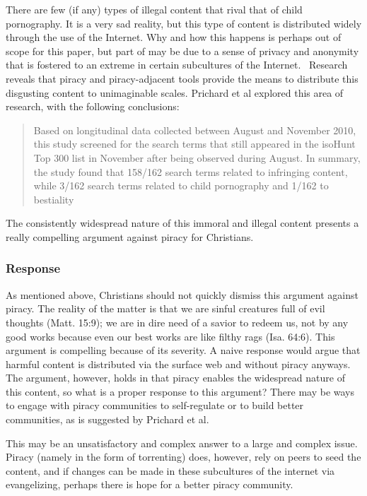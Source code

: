 \documentclass[onecolumn, 12pt]{article}
\begin{document}
There are few (if any) types of illegal content that rival that of child
pornography. It is a very sad reality, but this type of content is distributed
widely through the use of the Internet. Why and how this happens is perhaps out
of scope for this paper, but part of may be due to a sense of privacy and
anonymity that is fostered to an extreme in certain subcultures of the
Internet.~\cite[588]{prichard:subcultures} Research reveals that piracy and
piracy-adjacent tools provide the means to distribute this disgusting content
to unimaginable scales. Prichard et al explored this area of research, with
the following conclusions:
\blockcquote[593]{prichard:subcultures}{%
  Based on longitudinal data collected between August and November 2010, this
  study screened for the search terms that still appeared in the isoHunt Top
  300 list in November after being observed during August. In summary, the
  study found that 158/162 search terms related to infringing content, while
  3/162 search terms related to child pornography and 1/162 to bestiality%
}
The consistently widespread nature of this immoral and illegal content presents
a really compelling argument against piracy for Christians.

\subsubsection{Response}
As mentioned above, Christians should not quickly dismiss this argument against
piracy. The reality of the matter is that we are sinful creatures full of
evil thoughts (Matt. 15:9); we are in dire need of a savior to redeem us, not
by any good works because even our best works are like filthy rags (Isa. 64:6).
This argument is compelling because of its severity. A naive response would
argue that harmful content is distributed via the surface web and without
piracy anyways. The argument, however, holds in that piracy enables the
widespread nature of this content, so what is a proper response to this
argument? There may be ways to engage with piracy communities to self-regulate
or to build better communities, as is suggested by Prichard et
al.~\cite[595--596]{prichard:subcultures}

This may be an unsatisfactory and complex answer to a large and complex issue.
Piracy (namely in the form of torrenting) does, however, rely on peers to
seed the content, and if changes can be made in these subcultures of the
internet via evangelizing, perhaps there is hope for a better piracy community.
\end{document}
